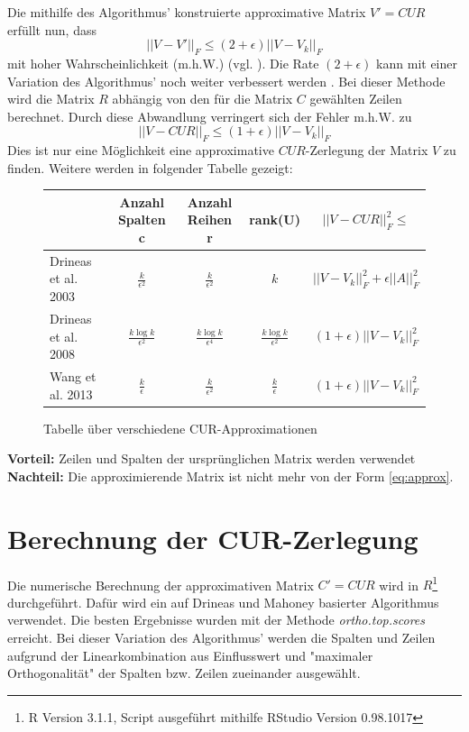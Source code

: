 \documentclass[12pt,a4paper,twoside]{article}
\begin{document}
		\newline
		Die mithilfe des Algorithmus' konstruierte approximative Matrix $V'=CUR$ erfüllt nun, dass
		\begin{equation*}
			||V-V'||_F\leq (2+\epsilon )||V-V_k||_F
		\end{equation*}		
		mit hoher Wahrscheinlichkeit (m.h.W.) (vgl. \citep{mahoney2008}). \newline
		\newline
		Die Rate $(2+\epsilon)$ kann mit einer Variation des Algorithmus' noch weiter verbessert werden \citep{Drineas2009}. Bei dieser Methode wird die Matrix $R$ abhängig von den für die Matrix $C$ gewählten Zeilen berechnet. Durch diese Abwandlung verringert sich der Fehler m.h.W. zu
		\begin{equation*}
			||V-CUR||_F\leq (1+\epsilon)||V-V_k||_F
		\end{equation*}
		Dies ist nur eine Möglichkeit eine approximative $CUR$-Zerlegung der Matrix $V$ zu finden. Weitere werden in 
		folgender Tabelle gezeigt: \newline
		\begin{figure}[h]
			\begin{tabular}{l||c|c|c|c}
		 		& Anzahl Spalten c & Anzahl Reihen r & rank(U) & $||V-CUR||_F^2\leq$ \\
		 		\hline \hline
		 		Drineas et al. 2003 \citep{drineas2003} & $\frac{k}{\epsilon^2}$ & $\frac{k}{\epsilon^2}$ & $k$ & $||V-V_k||_F^2+\epsilon||A||^2_F$ \\
		 		\hline
		 		Drineas et al. 2008 \citep{Drineas2009} & $\frac{k\log k}{\epsilon^2}$ & $\frac{k\log k}{\epsilon^4}$ & $\frac{k\log k}{\epsilon^2}$ & $(1+\epsilon)||V-V_k||^2_F$ \\
		 		\hline
		 		Wang et al. 2013 \citep{Wang2013}& $\frac{k}{\epsilon}$ & $\frac{k}{\epsilon^2}$ & $\frac{k}{\epsilon}$ & $(1+\epsilon)||V-V_k||^2_F$
			\end{tabular}
			\caption{Tabelle über verschiedene CUR-Approximationen}
		\end{figure}
		
		\textbf{Vorteil:} Zeilen und Spalten der ursprünglichen Matrix werden verwendet  \newline
		\newline
		\textbf{Nachteil:} Die approximierende Matrix ist nicht mehr von der Form \ref{eq:approx}. \newline
		\newline
\section{Berechnung der CUR-Zerlegung}
	Die numerische Berechnung der approximativen Matrix $C'=CUR$ wird in $R$\footnote{R Version 3.1.1, Script ausgeführt mithilfe RStudio Version 0.98.1017} durchgeführt. Dafür wird ein auf Drineas und Mahoney \citep{mahoney2008} basierter Algorithmus \citep{bodor2012} verwendet. \newline
	Die besten Ergebnisse wurden mit der Methode \textit{ortho.top.scores} erreicht. Bei dieser Variation des Algorithmus' werden die Spalten und Zeilen aufgrund der Linearkombination aus Einflusswert und "maximaler Orthogonalität" der Spalten bzw. Zeilen zueinander ausgewählt.
	\newpage
\end{document}
